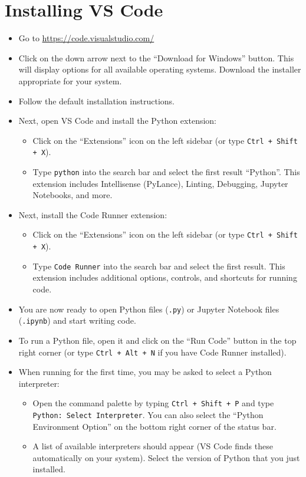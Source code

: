 \documentclass{UNB-Physics-Assignment}
\begin{document}
\section*{Installing VS Code}

\begin{itemize}
  \item Go to \href{https://code.visualstudio.com/}{https://code.visualstudio.com/}
  \item Click on the down arrow next to the ``Download for Windows'' button. This will display options for all available operating systems. Download the installer appropriate for your system.
  \item Follow the default installation instructions.
  \item Next, open VS Code and install the Python extension:
  \begin{itemize}
    \item Click on the ``Extensions'' icon on the left sidebar (or type \verb"Ctrl + Shift + X").
    \item Type \verb"python" into the search bar and select the first result ``Python''. This extension includes Intellisense (PyLance), Linting, Debugging, Jupyter Notebooks, and more.
  \end{itemize}
%
  \item Next, install the Code Runner extension:
  \begin{itemize}
    \item Click on the ``Extensions'' icon on the left sidebar (or type \verb"Ctrl + Shift + X").
    \item Type \verb"Code Runner" into the search bar and select the first result. This extension includes additional options, controls, and shortcuts for running code.
  \end{itemize}
%
  \item You are now ready to open Python files (\verb".py") or Jupyter Notebook files (\verb".ipynb") and start writing code.
  \item To run a Python file, open it and click on the ``Run Code'' button in the top right corner (or type \verb"Ctrl + Alt + N" if you have Code Runner installed).
  \item When running for the first time, you may be asked to select a Python interpreter:
  \begin{itemize}
    \item Open the command palette by typing \verb"Ctrl + Shift + P" and type \verb"Python: Select Interpreter". You can also select the ``Python Environment Option'' on the bottom right corner of the status bar.
    \item A list of available interpreters should appear (VS Code finds these automatically on your system). Select the version of Python that you just installed.
  \end{itemize}
%
\end{itemize}
\end{document}
